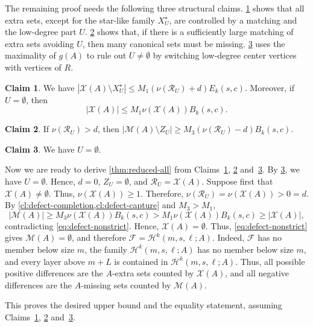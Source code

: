 \documentclass[10pt,a4paper]{article}
\numberwithin{equation}{section}
\theoremstyle{definition}
\newtheorem{claim}[claim]{Claim}
\newcommand{\F}{\mathcal F}
\newcommand{\X}{\mathcal X}
\newcommand{\M}{\mathcal M}
\newcommand{\Rcal}{\mathcal R}
\begin{document}
The remaining proof needs the following three structural claims.
\cref{cl:defect-capture} shows that all extra sets, except for the star-like family $X_U^\star$, are controlled by a matching and the low-degree part $U$.
\cref{cl:defect-completion} shows that, if there is a sufficiently large matching of extra sets avoiding $U$, then many canonical sets must be missing.
\cref{cl:defect-clean-center} uses the maximality of $g(A)$ to rule out $U\ne\emptyset$ by switching low-degree center vertices with vertices of $R$.

\begin{claim}\label{cl:defect-capture}
        We have $|\X(A)\setminus X_U^\star|\le M_1(\nu(\Rcal_U)+d)E_k(s,c)$.
        Moreover, if $U=\emptyset$, then
        \[
                |\X(A)|\le M_1\nu(\X(A))B_k(s,c).
        \]
\end{claim}
\begin{claim}\label{cl:defect-completion}
        If $\nu(\Rcal_U)>d$, then $|\M(A)\setminus Z_U|\ge M_3(\nu(\Rcal_U)-d)B_k(s,c)$.
\end{claim}
\begin{claim}\label{cl:defect-clean-center}
        We have $U=\emptyset$.
\end{claim}

Now we are ready to derive \cref{thm:reduced-all} from
Claims~\ref{cl:defect-capture}, \ref{cl:defect-completion}
and~\ref{cl:defect-clean-center}.
By \cref{cl:defect-clean-center}, we have $U=\emptyset$.
Hence, $d=0$, $Z_U=\emptyset$, and $\Rcal_U=\X(A)$.
Suppose first that $\X(A)\ne\emptyset$.
Thus, $\nu(\X(A))\ge1$.
Therefore, $\nu(\Rcal_U)=\nu(\X(A))>0=d$.  By
\cref{cl:defect-completion,cl:defect-capture} and $M_3>M_1$,
\[
        |\M(A)|
        \ge M_3\nu(\X(A))B_k(s,c)
        > M_1\nu(\X(A))B_k(s,c)
        \ge |\X(A)|,
\]
contradicting \eqref{eq:defect-nonstrict}.
Hence, $\X(A)=\emptyset$.
Thus, \eqref{eq:defect-nonstrict} gives $\M(A)=\emptyset$, and therefore $\F=\mathcal H^k(m,s,\ell;A)$.
Indeed, $\F$ has no member below size $m$, the family $\mathcal H^k(m,s,\ell;A)$ has no member below size $m$, and every layer above $m+L$ is contained in $\mathcal H^k(m,s,\ell;A)$.
Thus, all possible positive differences are the $A$-extra sets counted by $\X(A)$, and all negative differences are the $A$-missing sets counted by $\M(A)$.

This proves the desired upper bound and the equality statement, assuming Claims~\ref{cl:defect-capture}, \ref{cl:defect-completion} and~\ref{cl:defect-clean-center}.
\end{document}

